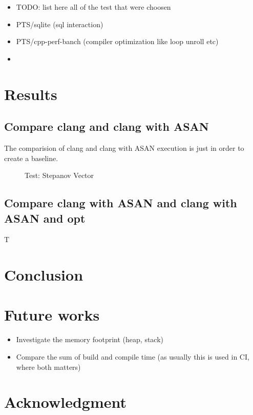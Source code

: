 \documentclass[letterpaper, 10 pt]{llncs}
\begin{document}
\begin{itemize}
	\item TODO: list here all of the test that were choosen
	\item PTS/sqlite (sql interaction)
	\item PTS/cpp-perf-banch (compiler optimization like loop unroll etc)
	\item 
\end{itemize}


\section{Results}

\subsection{Compare clang and clang with ASAN}

The comparision of clang and clang with ASAN execution is just in order to create a baseline.

\begin{figure}
\caption{Test: Stepanov Vector}
\end{figure}

\subsection{Compare clang with ASAN and clang with ASAN and opt}

T


\section{Conclusion}

\section{Future works}


\begin{itemize}
	\item Investigate the memory footprint (heap, stack)
	\item Compare the sum of build and compile time (as usually this is used in CI, where both matters)
\end{itemize}


\section*{Acknowledgment}


\printbibliography
\end{document}
